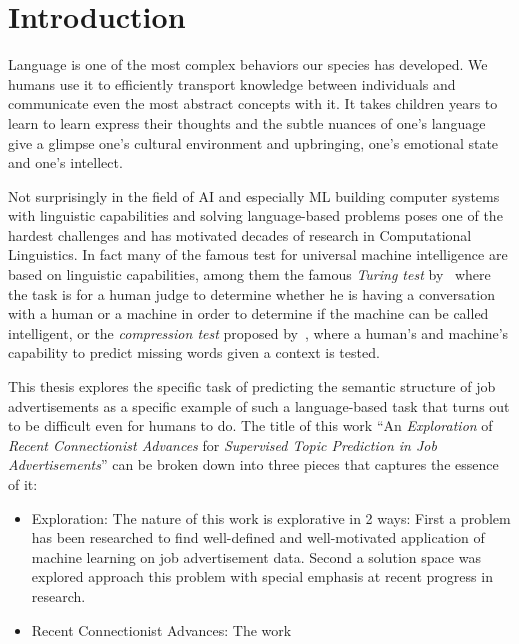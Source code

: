 
\thispagestyle{empty}


\section{Introduction}

Language is one of the most complex behaviors our species has developed. We humans use it to efficiently transport knowledge between individuals and communicate even the most abstract concepts with it. It takes children years to learn to learn express their thoughts and the subtle nuances of one's language give a glimpse one's cultural environment and upbringing, one's emotional state and one's intellect.

Not surprisingly in the field of \gls{AI} and especially \gls{ML} building computer systems with linguistic capabilities and solving language-based problems poses one of the hardest challenges and has motivated decades of research in Computational Linguistics. In fact many of the famous test for universal machine intelligence are based on linguistic capabilities, among them the famous \emph{Turing test} by~\cite{Turing:1950aa} where the task is for a human judge to determine whether he is having a conversation with a human or a machine in order to determine if the machine can be called intelligent, or the \emph{compression test} proposed by~\cite{Mahoney:1999aa}, where a human's and machine's capability to predict missing words given a context is tested.

This thesis explores the specific task of predicting the semantic structure of job advertisements as a specific example of such a language-based task that turns out to be difficult even for humans to do. The title of this work ``An \emph{Exploration} of \emph{Recent Connectionist Advances} for \emph{Supervised Topic Prediction in Job Advertisements}'' can be broken down into three pieces that captures the essence of it:

\begin{itemize}
  \item Exploration: The nature of this work is explorative in 2 ways: First a problem has been researched to find well-defined and well-motivated application of machine learning on job advertisement data. Second a solution space was explored approach this problem with special emphasis at recent progress in research.
  \item Recent Connectionist Advances: The work
\end{itemize}


